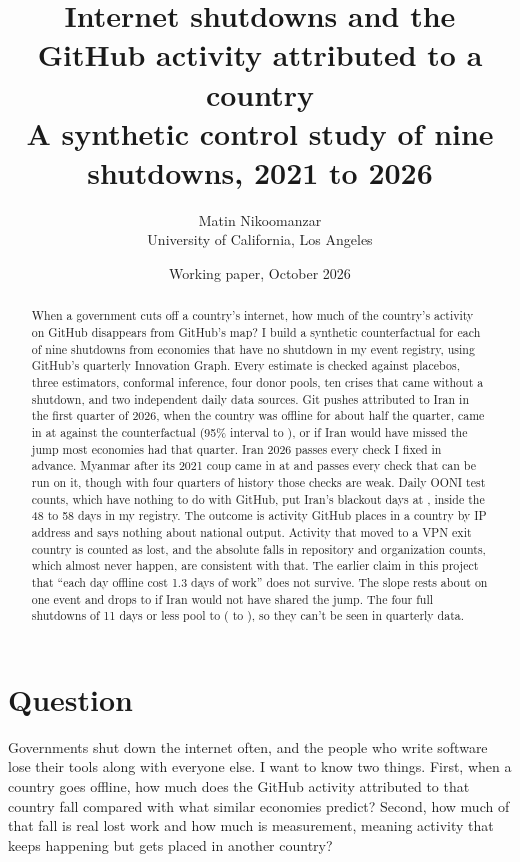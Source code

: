 \documentclass[11pt]{article}
\title{Internet shutdowns and the GitHub activity attributed to a country\\[4pt]
\large A synthetic control study of nine shutdowns, 2021 to 2026}
\author{Matin Nikoomanzar\\ \small University of California, Los Angeles}
\date{Working paper, October 2026}
\begin{document}
\maketitle

\begin{abstract}
\noindent When a government cuts off a country's internet, how much of the country's activity on GitHub disappears from GitHub's map? I build a synthetic counterfactual for each of nine shutdowns from \ndonors{} economies that have no shutdown in my event registry, using GitHub's quarterly Innovation Graph. Every estimate is checked against placebos, three estimators, conformal inference, four donor pools, ten crises that came without a shutdown, and two independent daily data sources. Git pushes attributed to Iran in the first quarter of 2026, when the country was offline for about half the quarter, came in at \sdidIRc{} against the counterfactual (95\% interval \sdidloIRc{} to \sdidhiIRc{}), or \flatIR{} if Iran would have missed the jump most economies had that quarter. Iran 2026 passes every check I fixed in advance. Myanmar after its 2021 coup came in at \sdidMM{} and passes every check that can be run on it, though with four quarters of history those checks are weak. Daily OONI test counts, which have nothing to do with GitHub, put Iran's blackout days at \ooniIRdays, inside the 48 to 58 days in my registry. The outcome is activity GitHub places in a country by IP address and says nothing about national output. Activity that moved to a VPN exit country is counted as lost, and the absolute falls in repository and organization counts, which almost never happen, are consistent with that. The earlier claim in this project that ``each day offline cost 1.3 days of work'' does not survive. The slope rests about \doseinfluence{} on one event and drops to \doseflat{} if Iran would not have shared the jump. The four full shutdowns of 11 days or less pool to \shortpool{} (\shortpoollo{} to \shortpoolhi), so they can't be seen in quarterly data.
\end{abstract}

\section{Question}

Governments shut down the internet often, and the people who write software lose their tools along with everyone else. I want to know two things. First, when a country goes offline, how much does the GitHub activity attributed to that country fall compared with what similar economies predict? Second, how much of that fall is real lost work and how much is measurement, meaning activity that keeps happening but gets placed in another country?
\end{document}
